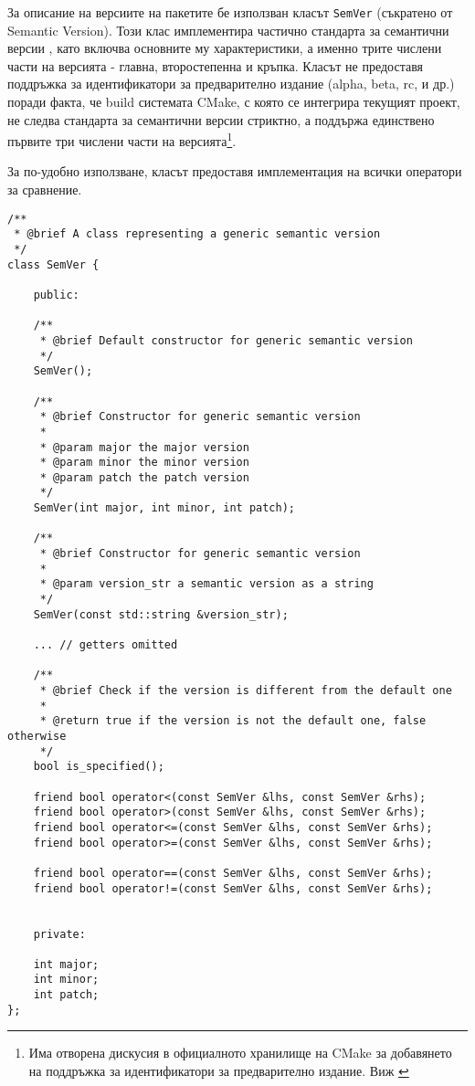 За описание на версиите на пакетите бе използван класът \texttt{SemVer}
(съкратено от Semantic Version). Този клас имплементира
частично стандарта за семантични версии \cite{semver}, като включва основните му
характеристики, а именно трите числени части на версията - главна, второстепенна
и кръпка. Класът не предоставя поддръжка за идентификатори за предварително
издание (alpha, beta, rc, и др.) поради факта, че build системата CMake, с която
се интегрира текущият проект, не следва стандарта за семантични версии стриктно,
а поддържа единствено първите три числени части на версията\footnote[1]{Има
отворена дискусия в официалното хранилище на CMake за добавянето на поддръжка за
идентификатори за предварително издание. Виж \cite{cmake_suffix}}.

За по-удобно използване, класът предоставя имплементация на всички оператори за
сравнение.

\begin{lstlisting}[style=cpp,
				   caption=Клас за версия,
				   label={lst:semver}]
/**
 * @brief A class representing a generic semantic version
 */
class SemVer {

	public:

	/**
	 * @brief Default constructor for generic semantic version
	 */
	SemVer();

	/**
	 * @brief Constructor for generic semantic version
	 * 
	 * @param major the major version
	 * @param minor the minor version
	 * @param patch the patch version
	 */
	SemVer(int major, int minor, int patch);

	/**
	 * @brief Constructor for generic semantic version
	 * 
	 * @param version_str a semantic version as a string
	 */
	SemVer(const std::string &version_str);

	... // getters omitted

	/**
	 * @brief Check if the version is different from the default one
	 * 
	 * @return true if the version is not the default one, false otherwise
	 */
	bool is_specified();

	friend bool operator<(const SemVer &lhs, const SemVer &rhs);
	friend bool operator>(const SemVer &lhs, const SemVer &rhs);
	friend bool operator<=(const SemVer &lhs, const SemVer &rhs);
	friend bool operator>=(const SemVer &lhs, const SemVer &rhs);

	friend bool operator==(const SemVer &lhs, const SemVer &rhs);
	friend bool operator!=(const SemVer &lhs, const SemVer &rhs);


	private:

	int major;
	int minor;
	int patch;
};
\end{lstlisting}


